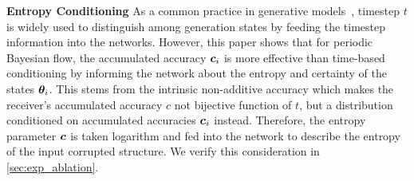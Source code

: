 \textbf{Entropy Conditioning} As a common practice in generative models~\citep{ddpm,flowmatching,bfn}, timestep $t$ is widely used to distinguish among generation states by feeding the timestep information into the networks. However, this paper shows that for periodic Bayesian flow, the accumulated accuracy ${\bm{c}}_i$ is more effective than time-based conditioning by informing the network about the entropy and certainty of the states $\boldsymbol{\theta}_{i}$. This stems from the intrinsic non-additive accuracy which makes the receiver's accumulated accuracy $c$ not bijective function of $t$, but a distribution conditioned on accumulated accuracies ${\bm{c}}_i$ instead. Therefore, the entropy parameter ${\bm{c}}$ is taken logarithm and fed into the network to describe the entropy of the input corrupted structure. We verify this consideration in \cref{sec:exp_ablation}. 




